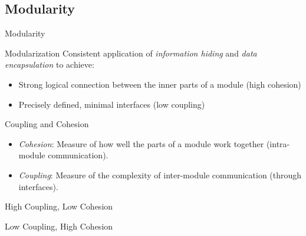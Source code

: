 \subsection{Modularity}
\begin{frame}{Modularity}
	\begin{mycolumns}[widths={50,50},animation=none]
		\begin{definition}{Modularization}
			Consistent application of \emph{information hiding} and \emph{data encapsulation} to achieve:
			\begin{itemize}
				\item Strong logical connection between the inner parts of a module (high cohesion)
				\item Precisely defined, minimal interfaces (low coupling)
			\end{itemize}						
		\end{definition}
		\pause
		\begin{definition}{Coupling and Cohesion}
			\begin{itemize}
				\item \emph{Cohesion}: Measure of how well the parts of a module work together (intra-module communication).
				\item \emph{Coupling}: Measure of the complexity of inter-module communication (through interfaces).
			\end{itemize}
		\end{definition}
	\mynextcolumn
		\vspace{-1cm}
		\begin{exampletight}{High Coupling, Low Cohesion}
			\centering
		\end{exampletight}
		\begin{exampletight}{Low Coupling, High Cohesion}
			\centering
		\end{exampletight}
	\end{mycolumns}
	\begin{mycolumns}[widths={50,50},animation=none]	
	\end{mycolumns}
\end{frame}

